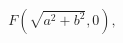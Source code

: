 \documentclass[preview]{standalone}
\begin{document}
\begin{align*}
F(\sqrt{a^2+b^2}, 0),
\end{align*}
\end{document}
